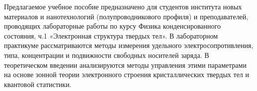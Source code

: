\begin{introduction}
\newpage


Предлагаемое учебное пособие предназначено для студентов института новых материалов и нанотехнологий (полупроводникового профиля) и преподавателей, проводящих лабораторные работы по курсу Физика конденсированного состояния, ч.1 «Электронная структура твердых тел». В лабораторном практикуме рассматриваются методы измерения удельного электросопротивления, типа, концентрации и подвижности свободных носителей заряда. В теоретическом введении анализируются методы управления этими параметрами на основе зонной теории электронного строения кристаллических твердых тел и квантовой статистики.

\end{introduction}